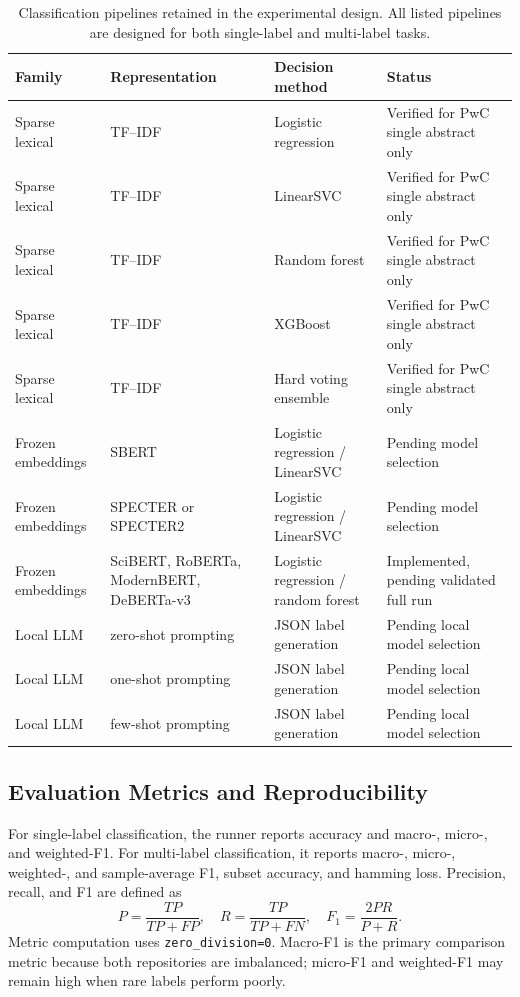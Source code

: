 \documentclass[pdflatex,sn-mathphys-num]{sn-jnl}
\theoremstyle{thmstyleone}%
\theoremstyle{thmstyletwo}%
\theoremstyle{thmstylethree}%
\begin{document}
\begin{table}[htbp]
\centering
\small
\caption{Classification pipelines retained in the experimental design. All listed pipelines are designed for both single-label and multi-label tasks.}
\label{tab:classification-pipeline-design}
\begin{tabularx}{\textwidth}{p{2.5cm}Yp{3.2cm}p{3.1cm}}
\toprule
Family & Representation & Decision method & Status \\
\midrule
Sparse lexical & TF--IDF & Logistic regression & Verified for PwC single abstract only \\
Sparse lexical & TF--IDF & LinearSVC & Verified for PwC single abstract only \\
Sparse lexical & TF--IDF & Random forest & Verified for PwC single abstract only \\
Sparse lexical & TF--IDF & XGBoost & Verified for PwC single abstract only \\
Sparse lexical & TF--IDF & Hard voting ensemble & Verified for PwC single abstract only \\
Frozen embeddings & SBERT & Logistic regression / LinearSVC & Pending model selection \\
Frozen embeddings & SPECTER or SPECTER2 & Logistic regression / LinearSVC & Pending model selection \\
Frozen embeddings & SciBERT, RoBERTa, ModernBERT, DeBERTa-v3 & Logistic regression / random forest & Implemented, pending validated full run \\
Local LLM & zero-shot prompting & JSON label generation & Pending local model selection \\
Local LLM & one-shot prompting & JSON label generation & Pending local model selection \\
Local LLM & few-shot prompting & JSON label generation & Pending local model selection \\
\bottomrule
\end{tabularx}
\end{table}

\subsection{Evaluation Metrics and Reproducibility}
\label{subsec:evaluation-metrics}

For single-label classification, the runner reports accuracy and macro-, micro-, and weighted-F1. For multi-label classification, it reports macro-, micro-, weighted-, and sample-average F1, subset accuracy, and hamming loss. Precision, recall, and F1 are defined as
\[
P=\frac{TP}{TP+FP}, \quad R=\frac{TP}{TP+FN}, \quad F_1=\frac{2PR}{P+R}.
\]
Metric computation uses \texttt{zero\_division=0}. Macro-F1 is the primary comparison metric because both repositories are imbalanced; micro-F1 and weighted-F1 may remain high when rare labels perform poorly.
\end{document}
